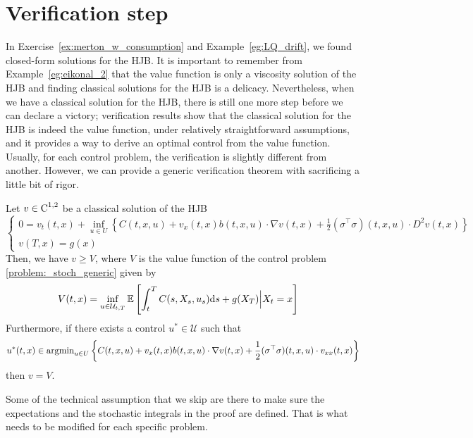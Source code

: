 \documentclass[11pt]{book}
\newcommand{\ds}{\text{\normalfont d}s}
\begin{document}
\section{Verification step}
In Exercise~\ref{ex:merton_w_consumption} and Example~\ref{eg:LQ_drift}, we found closed-form solutions for the HJB. It is important to remember from Example~\ref{eg:eikonal_2} that the value function is only a viscosity solution of the HJB and finding classical solutions for the HJB is a delicacy. Nevertheless, when we have a classical solution for the HJB, there is still one more step before we can declare a victory; verification results show that the classical solution for the HJB is indeed the value function, under relatively straightforward assumptions, and it provides a way to derive an optimal control from the value function. Usually, for each control problem, the verification is slightly different from another. However, we can provide a generic verification theorem with sacrificing a little bit of rigor.
\begin{thm}\label{thm:verification}
    Let $v\in\text{\normalfont C}^{1,2}$ be a classical solution of the HJB 
    \[
    \begin{cases}
    0= v_t(t,x) + \inf_{u\in U}\left\{ C(t,x,u)  + v_x(t,x) b(t,x,u)\cdot \nabla v(t,x)+\frac12 (\sigma^\top\sigma)(t,x,u)\cdot D^2v(t,x) \right\}\\
    v(T,x)=g(x)
\end{cases}
\]
Then, we have $v\ge V$, where $V$ is the value function of the control problem \eqref{problem:_stoch_generic} given by 
\begin{equation}
\begin{split}
    V(t,x) &=\inf_{u\in\mathcal{U}_{t,T}}\mathbb{E}\left[\int_{t}^{T}C(s,X_s,u_s){{\ds}}+g(X_T)\Big|{X_t=x}\right]
\end{split}
\end{equation}
Furthermore, if there exists a control $u^*\in\mathcal{U}$ such that
\[
u^*(t,x)\in\text{\normalfont argmin}_{u\in U}\left\{  C(t,x,u)  + v_x(t,x) b(t,x,u)\cdot \nabla v(t,x)+\frac12 (\sigma^\top\sigma)(t,x,u)\cdot v_{xx}(t,x)\right\}
\]
then $v=V$.
\end{thm}
Some of the technical assumption that we skip are there to make sure the expectations and the stochastic integrals in the proof are defined. That is what needs to be modified for each specific problem.
\end{document}
